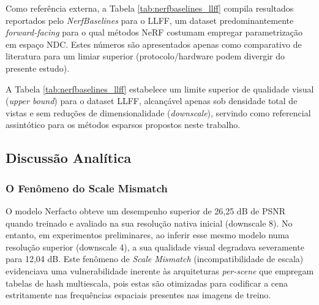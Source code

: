 \documentclass[12pt]{article}
\begin{document}
Como referência externa, a Tabela \ref{tab:nerfbaselines_llff} compila resultados reportados pelo \textit{NerfBaselines} \cite{kulhanek2025nerfbaselinesconsistentreproducibleevaluation} para o LLFF, um dataset predominantemente \textit{forward-facing} para o qual métodos NeRF costumam empregar parametrização em espaço NDC. Estes números são apresentados apenas como comparativo de literatura para um limiar superior (protocolo/hardware podem divergir do presente estudo).

\begin{table}[H]
\centering
\caption{Resultados no LLFF reportados pelo \textit{NerfBaselines} \cite{kulhanek2025nerfbaselinesconsistentreproducibleevaluation}. "Time" refere-se ao tempo total de treinamento reportado e "GPU mem." ao pico de memória alocada durante o treino.}
\label{tab:nerfbaselines_llff}
\end{table}

A Tabela \ref{tab:nerfbaselines_llff} estabelece um limite superior de qualidade visual (\textit{upper bound}) para o dataset LLFF, alcançável apenas sob densidade total de vistas e sem reduções de dimensionalidade (\textit{downscale}), servindo como referencial assintótico para os métodos esparsos propostos neste trabalho.

\subsection{Discussão Analítica}

\subsubsection{O Fenômeno do Scale Mismatch}

O modelo Nerfacto obteve um desempenho superior de 26,25 dB de PSNR quando treinado e avaliado na sua resolução nativa inicial (downscale 8). No entanto, em experimentos preliminares, ao inferir esse mesmo modelo numa resolução superior (downscale 4), a sua qualidade visual degradava severamente para 12,04 dB. Este fenômeno de \textit{Scale Mismatch} (incompatibilidade de escala) evidenciava uma vulnerabilidade inerente às arquiteturas \textit{per-scene} que empregam tabelas de hash multiescala, pois estas são otimizadas para codificar a cena estritamente nas frequências espaciais presentes nas imagens de treino. 
\end{document}
